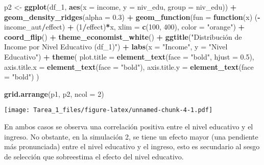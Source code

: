 \documentclass[
]{article}
\newenvironment{Shaded}{\begin{snugshade}}{\end{snugshade}}
\newcommand{\AttributeTok}[1]{\textcolor[rgb]{0.13,0.29,0.53}{#1}}
\newcommand{\ControlFlowTok}[1]{\textcolor[rgb]{0.13,0.29,0.53}{\textbf{#1}}}
\newcommand{\DecValTok}[1]{\textcolor[rgb]{0.00,0.00,0.81}{#1}}
\newcommand{\FloatTok}[1]{\textcolor[rgb]{0.00,0.00,0.81}{#1}}
\newcommand{\FunctionTok}[1]{\textcolor[rgb]{0.13,0.29,0.53}{\textbf{#1}}}
\newcommand{\NormalTok}[1]{#1}
\newcommand{\OtherTok}[1]{\textcolor[rgb]{0.56,0.35,0.01}{#1}}
\newcommand{\SpecialCharTok}[1]{\textcolor[rgb]{0.81,0.36,0.00}{\textbf{#1}}}
\newcommand{\StringTok}[1]{\textcolor[rgb]{0.31,0.60,0.02}{#1}}
\begin{document}
\begin{Shaded}
\begin{Highlighting}[]
\NormalTok{p2 }\OtherTok{\textless{}{-}} \FunctionTok{ggplot}\NormalTok{(df\_1, }\FunctionTok{aes}\NormalTok{(}\AttributeTok{x =}\NormalTok{ income, }\AttributeTok{y =}\NormalTok{ niv\_edu, }\AttributeTok{group =}\NormalTok{ niv\_edu)) }\SpecialCharTok{+}
  \FunctionTok{geom\_density\_ridges}\NormalTok{(}\AttributeTok{alpha =} \FloatTok{0.3}\NormalTok{) }\SpecialCharTok{+}
  \FunctionTok{geom\_function}\NormalTok{(}\AttributeTok{fun =} \ControlFlowTok{function}\NormalTok{(x) (}\SpecialCharTok{{-}}\NormalTok{income\_aut}\SpecialCharTok{/}\NormalTok{effect) }\SpecialCharTok{+}\NormalTok{ (}\DecValTok{1}\SpecialCharTok{/}\NormalTok{effect)}\SpecialCharTok{*}\NormalTok{x, }\AttributeTok{xlim =} \FunctionTok{c}\NormalTok{(}\DecValTok{100}\NormalTok{, }\DecValTok{400}\NormalTok{), }\AttributeTok{color =} \StringTok{"orange"}\NormalTok{) }\SpecialCharTok{+}
  \FunctionTok{coord\_flip}\NormalTok{() }\SpecialCharTok{+}
  \FunctionTok{theme\_economist\_white}\NormalTok{() }\SpecialCharTok{+}
  \FunctionTok{ggtitle}\NormalTok{(}\StringTok{"Distribución de Income por Nivel Educativo (df\_1)"}\NormalTok{) }\SpecialCharTok{+} 
  \FunctionTok{labs}\NormalTok{(}\AttributeTok{x =} \StringTok{"Income"}\NormalTok{, }\AttributeTok{y =} \StringTok{"Nivel Educativo"}\NormalTok{) }\SpecialCharTok{+}
  \FunctionTok{theme}\NormalTok{(}
    \AttributeTok{plot.title =} \FunctionTok{element\_text}\NormalTok{(}\AttributeTok{face =} \StringTok{"bold"}\NormalTok{, }\AttributeTok{hjust =} \FloatTok{0.5}\NormalTok{),}
    \AttributeTok{axis.title.x =} \FunctionTok{element\_text}\NormalTok{(}\AttributeTok{face =} \StringTok{"bold"}\NormalTok{),}
    \AttributeTok{axis.title.y =} \FunctionTok{element\_text}\NormalTok{(}\AttributeTok{face =} \StringTok{"bold"}\NormalTok{)}
\NormalTok{  )}


\FunctionTok{grid.arrange}\NormalTok{(p1, p2, }\AttributeTok{ncol =} \DecValTok{2}\NormalTok{)}
\end{Highlighting}
\end{Shaded}

\texttt{[image: Tarea\_1\_files/figure-latex/unnamed-chunk-4-1.pdf]}

En ambos casos se observa una correlación positiva entre el nivel
educativo y el ingreso. No obstante, en la simulación 2, se tiene un
efecto mayor (una pendiente más pronunciada) entre el nivel educativo y
el ingreso, esto es secundario al sesgo de selección que sobreestima el
efecto del nivel educativo.
\end{document}

